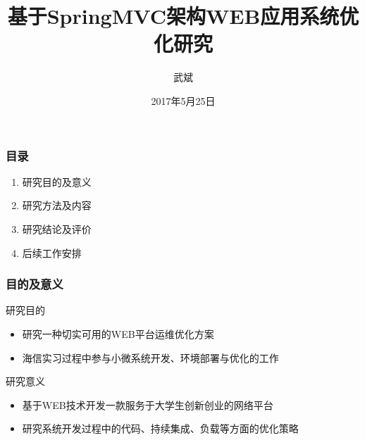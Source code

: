 \documentclass{beamer}
\title{基于SpringMVC架构WEB应用系统优化研究}
\author{武斌}
\institute
{
  电子系~中国海洋大学
  \and
   Department electronic engineering \\
  Ocean University Of China
}
\date{2017年5月25日}
\begin{document}
\begin{frame}
  \titlepage
\end{frame}


\begin{frame}
  \frametitle{目录}
  \begin{enumerate}
    \item<1-> 研究目的及意义
    \item<1-> 研究方法及内容
    \item<1-> 研究结论及评价
    \item<1-> 后续工作安排
  \end{enumerate}
\end{frame}


\begin{frame}
  \frametitle{目的及意义}
  \begin{block}{研究目的}
  	\begin{itemize}
  		\item 研究一种切实可用的WEB平台运维优化方案
  		\item 海信实习过程中参与小微系统开发、环境部署与优化的工作
  	\end{itemize}
  \end{block}
  \begin{block}{研究意义}
  	\begin{itemize}
  		\item 基于WEB技术开发一款服务于大学生创新创业的网络平台
  		\item 研究系统开发过程中的代码、持续集成、负载等方面的优化策略
  	\end{itemize}
  \end{block}
\end{frame}
\end{document}
